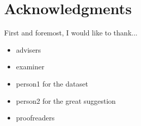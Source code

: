 \chapter{Acknowledgments}

First and foremost, I would like to thank...
\begin{itemize}
\item{advisers}
\item{examiner}
\item{person1 for the dataset}
\item{person2 for the great suggestion}
\item{proofreaders}
\end{itemize}